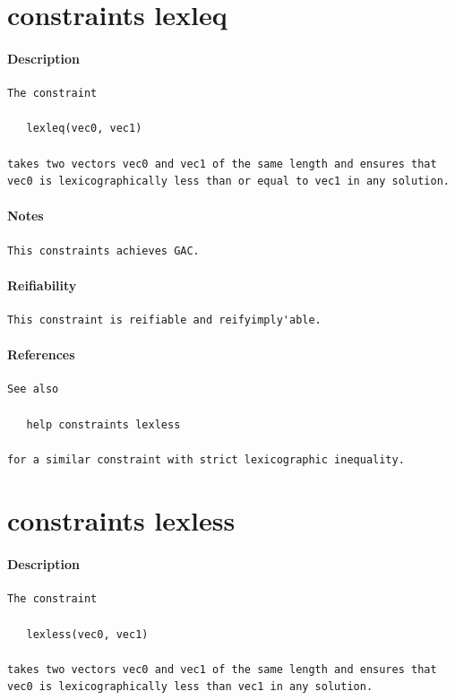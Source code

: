 \documentclass[oneside]{book}
\begin{document}
\section{constraints lexleq}
\paragraph{Description}
{\footnotesize
\begin{verbatim}
The constraint

   lexleq(vec0, vec1)

takes two vectors vec0 and vec1 of the same length and ensures that
vec0 is lexicographically less than or equal to vec1 in any solution.
\end{verbatim}
}
\paragraph{Notes}
{\footnotesize
\begin{verbatim}
This constraints achieves GAC.
\end{verbatim}
}
\paragraph{Reifiability}
{\footnotesize
\begin{verbatim}
This constraint is reifiable and reifyimply'able.
\end{verbatim}
}
\paragraph{References}
{\footnotesize
\begin{verbatim}
See also

   help constraints lexless

for a similar constraint with strict lexicographic inequality.
\end{verbatim}
}
\section{constraints lexless}
\paragraph{Description}
{\footnotesize
\begin{verbatim}
The constraint

   lexless(vec0, vec1)

takes two vectors vec0 and vec1 of the same length and ensures that
vec0 is lexicographically less than vec1 in any solution.
\end{verbatim}
}
\end{document}

